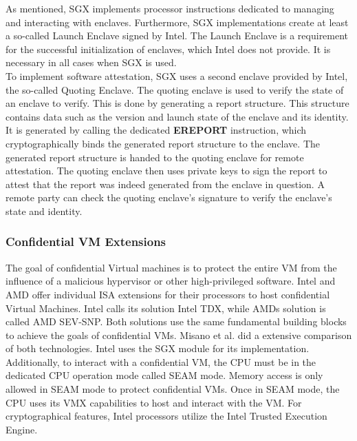 As mentioned, SGX implements processor instructions dedicated to managing and
interacting with enclaves. Furthermore, SGX implementations create at least a
so-called Launch Enclave signed by Intel. The Launch Enclave is a requirement
for the successful initialization of enclaves, which Intel does not provide. It
is necessary in all cases when SGX is used.\\

To implement software attestation, SGX uses a second enclave provided by Intel,
the so-called Quoting Enclave. The quoting enclave is used to verify the state
of an enclave to verify. This is done by generating a report structure. This
structure contains data such as the version and launch state of the enclave and
its identity. It is generated by calling the dedicated \textbf{EREPORT}
instruction, which cryptographically binds the generated report structure to the
enclave. The generated report structure is handed to the quoting enclave for
remote attestation. The quoting enclave then uses private keys to sign the
report to attest that the report was indeed generated from the enclave in
question. A remote party can check the quoting enclave's signature to verify the
enclave's state and identity.\\

\subsubsection{Confidential VM Extensions}
\label{section:20:confidential_vms}
The goal of confidential Virtual machines is to protect the entire VM from the
influence of a malicious hypervisor or other high-privileged software. Intel and
AMD offer individual ISA extensions for their processors to host confidential
Virtual Machines. Intel calls its solution Intel TDX, while AMDs solution is
called AMD SEV-SNP.\cite{tdx_whitepaper,kaplan_amd_2020} Both solutions use the
same fundamental building blocks to achieve the goals of confidential VMs.
Misano et al. did a extensive comparison of both
technologies.\cite{misono_confidential_2024} Intel uses the SGX module for its
implementation. Additionally, to interact with a confidential VM, the CPU must
be in the dedicated CPU operation mode called SEAM mode. Memory access is only
allowed in SEAM mode to protect confidential VMs. Once in SEAM mode, the CPU
uses its VMX capabilities to host and interact with the VM. For cryptographical
features, Intel processors utilize the Intel Trusted Execution Engine.\\

